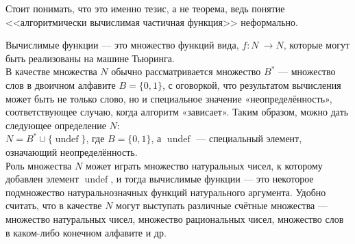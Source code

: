     \begin{Rem}
        Стоит понимать, что это именно тезис, а не теорема, ведь понятие <<алгоритмически вычислимая частичная функция>> неформально.
    \end{Rem}
    \begin{Def} 
        Вычислимые функции — это множество функций вида, $ f \colon N\ \to N $, которые могут быть реализованы на машине Тьюринга.\\
        В качестве множества $N$ обычно рассматривается множество $B^{*}$ — множество слов в двоичном алфавите $B = \{0,1\}$, с оговоркой, что результатом вычисления может быть не только слово, но и специальное значение «неопределённость», соответствующее случаю, когда алгоритм «зависает». Таким образом, можно дать следующее определение $N$:\\
        $N=B^{*}\cup \{\operatorname{undef} \}$, где $B=\{0,1\}$, а $\operatorname{undef}$ — специальный элемент, означающий неопределённость.\\
        Роль множества $N$ может играть множество натуральных чисел, к которому добавлен элемент $ \operatorname{undef} $, и тогда вычислимые функции --- это некоторое подмножество натуральнозначных функций натурального аргумента. Удобно считать, что в качестве $N$ могут выступать различные счётные множества --- множество натуральных чисел, множество рациональных чисел, множество слов в каком-либо конечном алфавите и др. 
    \end{Def}
    
    
